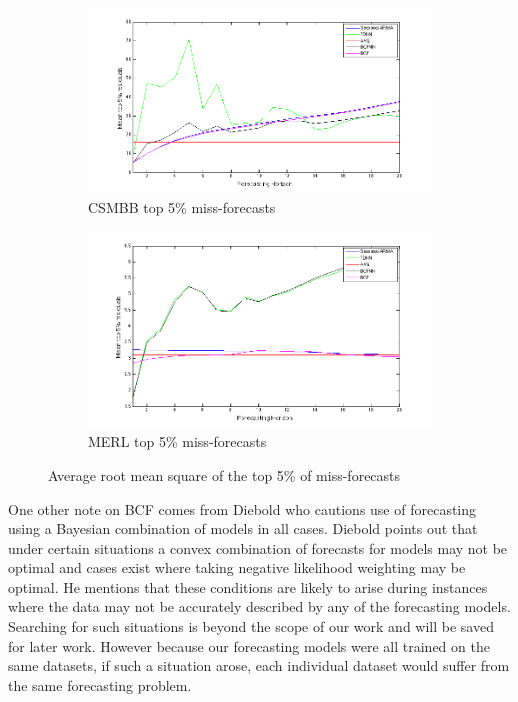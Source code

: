 \documentclass{acm_proc_article-sp}
\begin{document}
\begin{figure}[t!]
\centering
\begin{subfigure}{.45\textwidth}
  \centering
  \includegraphics[width=1.0\linewidth]{brown_top5.png}
  \caption{CSMBB top 5\% miss-forecasts}
  \label{fig:csmtop5}
\end{subfigure}
\begin{subfigure}{.45\textwidth}
  \centering
  \includegraphics[width=1.0\linewidth]{merl_top5.png}
  \caption{MERL top 5\% miss-forecasts}
  \label{fig:merltop5}
\end{subfigure}
\caption{Average root mean square of the top 5\% of miss-forecasts}
\label{fig:top5plot}
\end{figure}

One other note on BCF comes from Diebold \cite{Diebold1991} who cautions use of forecasting using a Bayesian combination of models in all cases.  Diebold points out that under certain situations a convex combination of forecasts for models may not be optimal and cases exist where taking negative likelihood weighting may be optimal.  He mentions that these conditions are likely to arise during instances where the data may not be accurately described by any of the forecasting models.  Searching for such situations is beyond the scope of our work and will be saved for later work.  However because our forecasting models were all trained on the same datasets, if such a situation arose, each individual dataset would suffer from the same forecasting problem. 
\end{document}
